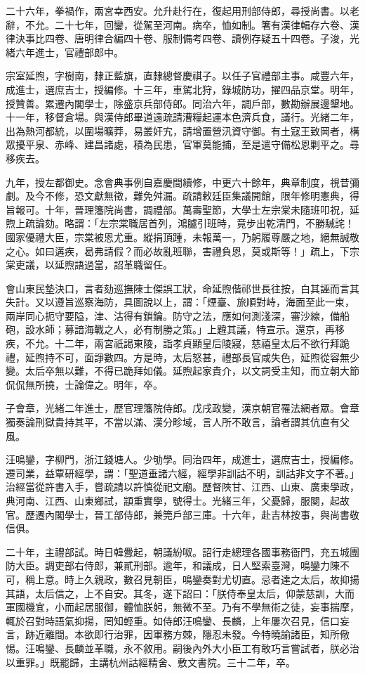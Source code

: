 \begin{pinyinscope}
二十六年，拳禍作，兩宮幸西安。允升赴行在，復起用刑部侍郎，尋授尚書。以老辭，不允。二十七年，回鑾，從駕至河南。病卒，恤如制。箸有漢律輯存六卷、漢律決事比四卷、唐明律合編四十卷、服制備考四卷、讀例存疑五十四卷。子浚，光緒六年進士，官禮部郎中。

宗室延煦，字樹南，隸正藍旗，直隸總督慶祺子。以任子官禮部主事。咸豐六年，成進士，選庶吉士，授編修。十三年，車駕北狩，錄城防功，擢四品京堂。明年，授贊善。累遷內閣學士，除盛京兵部侍郎。同治六年，調戶部，數勘辦展邊墾地。十一年，移督倉場。與漢侍郎畢道遠疏請漕糧起運本色濟兵食，議行。光緒二年，出為熱河都統，以圍場曠莽，易叢奸宄，請增置營汛資守御。有土寇王致岡者，構眾擾平泉、赤峰、建昌諸處，積為民患，官軍莫能捕，至是遣守備松恩剿平之。尋移疾去。

九年，授左都御史。念會典事例自嘉慶間續修，中更六十餘年，典章制度，視昔彌劇。及今不修，恐文獻無徵，難免舛漏。疏請敕廷臣集議開館，限年修明憲典，得旨報可。十年，晉理籓院尚書，調禮部。萬壽聖節，大學士左宗棠未隨班叩祝，延煦上疏論劾。略謂：「左宗棠職居首列，鴻臚引班時，竟步出乾清門，不勝駴詫！國家優禮大臣，宗棠被恩尤重。縱捐頂踵，未報萬一，乃躬履尊嚴之地，絕無誠敬之心。如曰遘疾，曷弗請假？而必故亂班聯，害禮負恩，莫或斯等！」疏上，下宗棠吏議，以延煦語過當，詔革職留任。

會山東民墊決口，言者劾巡撫陳士傑誤工狀，命延煦偕祁世長往按，白其誣而言其失計。又以遵旨巡察海防，具圖說以上，謂：「煙臺、旅順對峙，海面至此一束，兩岸同心扼守要隘，津、沽得有鎖鑰。防守之法，應如何測淺深，審沙線，備船砲，設水師；募諳海戰之人，必有制勝之策。」上韙其議，特宣示。還京，再移疾，不允。十二年，兩宮祇謁東陵，詣孝貞顯皇后陵寢，慈禧皇太后不欲行拜跪禮，延煦持不可，面諍數四。方是時，太后怒甚，禮部長官咸失色，延煦從容無少變。太后卒無以難，不得已跪拜如儀。延煦起家貴介，以文詞受主知，而立朝大節侃侃無所撓，士論偉之。明年，卒。

子會章，光緒二年進士，歷官理籓院侍郎。戊戌政變，漢京朝官罹法網者眾。會章獨奏論刑獄貴持其平，不當以滿、漢分畛域，言人所不敢言，論者謂其伉直有父風。

汪鳴鑾，字柳門，浙江錢塘人。少劬學。同治四年，成進士，選庶吉士，授編修。遷司業，益覃研經學，謂：「聖道垂諸六經，經學非訓詁不明，訓詁非文字不著。」治經當從許書入手，嘗疏請以許慎從祀文廟。歷督陜甘、江西、山東、廣東學政，典河南、江西、山東鄉試，顓重實學，號得士。光緒三年，父憂歸，服闋，起故官。歷遷內閣學士，晉工部侍郎，兼筦戶部三庫。十六年，赴吉林按事，與尚書敬信俱。

二十年，主禮部試。時日韓釁起，朝議紛呶。詔行走總理各國事務衙門，充五城團防大臣。調吏部右侍郎，兼貳刑部。逾年，和議成，日人堅索臺灣，鳴鑾力陳不可，稱上意。時上久親政，數召見朝臣，鳴鑾奏對尤切直。忌者達之太后，故抑揚其語，太后信之，上不自安。其冬，遂下詔曰：「朕侍奉皇太后，仰蒙慈訓，大而軍國機宜，小而起居服御，體恤朕躬，無微不至。乃有不學無術之徒，妄事揣摩，輒於召對時語氣抑揚，罔知輕重。如侍郎汪鳴鑾、長麟，上年屢次召見，信口妄言，跡近離間。本欲即行治罪，因軍務方棘，隱忍未發。今特曉諭諸臣，知所儆惕。汪鳴鑾、長麟並革職，永不敘用。嗣後內外大小臣工有敢巧言嘗試者，朕必治以重罪。」既罷歸，主講杭州詁經精舍、敷文書院。三十二年，卒。


\end{pinyinscope}

